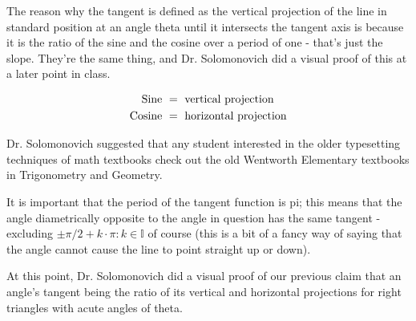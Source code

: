 \documentclass{article}
\begin{document}
The reason why the tangent is defined as the vertical projection of the line in standard position at an angle theta until it intersects the tangent axis is because it is the ratio of the sine and the cosine over a period of one - that's just the slope. They're the same thing, and Dr. Solomonovich did a visual proof of this at a later point in class.

\begin{align*}
\textnormal{Sine }&=\textnormal{ vertical

projection}\\
\textnormal{Cosine }&=\textnormal{ horizontal

projection}
\end{align*}

\vspace{10pt}

Dr. Solomonovich suggested that any student interested in the older typesetting techniques of math textbooks check out the old Wentworth Elementary textbooks in Trigonometry and Geometry.

\vspace{10pt}

It is important that the period of the tangent function is  pi; this means that the angle diametrically opposite to the angle in question has the same tangent - excluding $\pm\pi/2+k\cdot\pi:k\in\mathbb{I}$ of course (this is a bit of a fancy way of saying that the angle cannot cause the line to point straight up or down).

\vspace{10pt}

At this point, Dr. Solomonovich did a visual proof of our previous claim that an angle's tangent being the ratio of  its vertical and horizontal projections for right triangles with acute angles of theta.

\vspace{10pt}

\begin{center}
\end{center}
\end{document}
